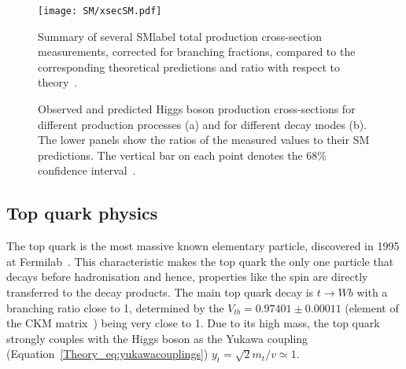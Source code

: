 \begin{figure}[htbp]
    \RawFloats
    \begin{center}
    \texttt{[image: SM/xsecSM.pdf]}
    \caption{
        Summary of several \acrshort{SMlabel} total production cross-section measurements, corrected for branching fractions, compared to the corresponding theoretical predictions and ratio with respect to theory~\cite{ATLAS:2022djm}. 
    }
    \label{figSM:xsecSM}
    \end{center}
\end{figure}

\begin{figure}[htbp]
    \RawFloats
    \begin{center}
        \quad
        \caption{
            }
            Observed and predicted Higgs boson production cross-sections for different production processes (a) and for different decay modes (b). The lower panels show the ratios of the measured values to their SM predictions. The vertical bar on each point denotes the 68\% confidence interval~\cite{HiggssumaryAtlas2022}. 
    \label{figSM:xsecBRH}
    \end{center}
\end{figure}

\clearpage
\subsection{Top quark physics}

The top quark is the most massive known elementary particle, discovered in 1995 at Fermilab~\cite{topsearch1995,PhysRevLett.74.2626}. This characteristic makes the top quark the only one particle that decays before hadronisation and hence, properties like the spin are directly transferred to the decay products. The main top quark decay is $t\to Wb$ with a branching ratio close to 1, determined by the $V_{tb}=0.97401 \pm 0.00011$ (element of the CKM matrix~\cite{pdg}) being very close to 1. Due to its high mass, the top quark strongly couples with the Higgs boson as the Yukawa coupling (Equation~\ref{Theory_eq:yukawacouplings}) $y_t=\sqrt{2}m_t/v\simeq 1$.\\

